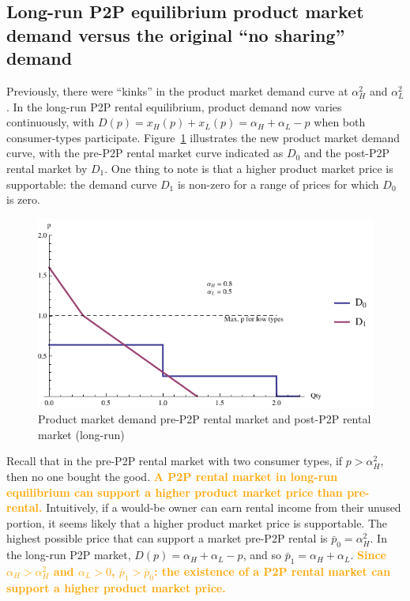 \documentclass[11pt]{article}
\newcommand{\important}[1]{\textcolor{orange}{\textbf{#1}}}
\begin{document}
\subsection{Long-run P2P equilibrium product market demand versus the original ``no sharing'' demand} 
Previously, there were ``kinks'' in the product market demand curve at $\alpha_H^2$ and $\alpha_L^2$. 
In the long-run P2P rental equilibrium, product demand now varies continuously, with $D(p) = x_H(p) + x_L(p) = \alpha_H + \alpha_L - p$ when both consumer-types participate. 
Figure~\ref{fig:demand} illustrates the new product market demand curve, with the pre-P2P rental market curve indicated as $D_0$ and the post-P2P rental market by $D_1$. 
One thing to note is that a higher product market price is supportable: the demand curve $D_1$ is non-zero for a range of prices for which $D_0$ is zero.  

\begin{figure}
\caption{Product market demand pre-P2P rental market and post-P2P rental market (long-run)}
\label{fig:demand} 
\begin{center}
\includegraphics[scale = 1]{./diagrams/p2plr_demand.pdf}
\end{center}
\end{figure} 

Recall that in the pre-P2P rental market with two consumer types, if $p > \alpha_H^2$, then no one bought the good. 
\important{A P2P rental market in long-run equilibrium can support a higher product market price than pre-rental.}  
Intuitively, if a would-be owner can earn rental income from their unused portion, it seems likely that a higher product market price is supportable. 
The highest possible price that can support a market pre-P2P rental is $\bar{p}_0 = \alpha_H^2$.  
In the long-run P2P market, $D(p) = \alpha_H + \alpha_L - p$, and so $\bar{p}_{1} = \alpha_H + \alpha_L$. 
\important{Since $\alpha_H > \alpha_H^2$ and $\alpha_L > 0$, $\bar{p}_1 > \bar{p}_0$: the existence of a P2P rental market can support a higher product market price.} 
\end{document}
